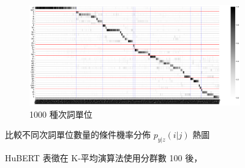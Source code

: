 {{{\begin{figure}
             \vfill
             \begin{subfigure}{\textwidth}
                 \centering
                 \includegraphics[width=\tempwidth]{figures/ch4figs/hub-u100-ap1000-givenunit-byphn.png}
                 \caption{1000 種次詞單位}
                 \label{fig:hub-u100-ap1000-givenunit-byphn}
             \end{subfigure}

             \caption{HuBERT 表徵在 K-平均演算法使用分群數 100 後，}
             比較不同次詞單位數量的條件機率分佈 $p_{y|z}(i | j)$ 熱圖
             \label{fig:hub-u100-comparisons}
        \end{figure}
    }
}

}
